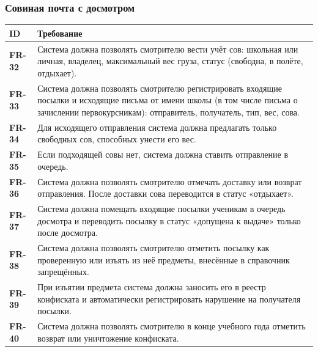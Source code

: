 \documentclass[a4paper,12pt]{article}
\newcommand{\req}[2]{\textbf{#1} & #2 \\ \hline}
\newenvironment{reqtable}{%
  \begin{longtable}{|>{\raggedright\arraybackslash}p{19mm}|>{\raggedright\arraybackslash}p{137mm}|}
  \hline
  \rowcolor{black!8}\textbf{ID} & \textbf{Требование} \\ \hline
  \endhead}{\end{longtable}}
\begin{document}
\subsubsection{Совиная почта с досмотром}
\begin{reqtable}
\req{FR-32}{Система должна позволять смотрителю вести учёт сов: школьная или личная, владелец, максимальный вес груза, статус (свободна, в полёте, отдыхает).}
\req{FR-33}{Система должна позволять смотрителю регистрировать входящие посылки и исходящие письма от имени школы (в том числе письма о зачислении первокурсникам): отправитель, получатель, тип, вес, сова.}
\req{FR-34}{Для исходящего отправления система должна предлагать только свободных сов, способных унести его вес.}
\req{FR-35}{Если подходящей совы нет, система должна ставить отправление в очередь.}
\req{FR-36}{Система должна позволять смотрителю отмечать доставку или возврат отправления. После доставки сова переводится в статус «отдыхает».}
\req{FR-37}{Система должна помещать входящие посылки ученикам в очередь досмотра и переводить посылку в статус «допущена к выдаче» только после досмотра.}
\req{FR-38}{Система должна позволять смотрителю отметить посылку как проверенную или изъять из неё предметы, внесённые в справочник запрещённых.}
\req{FR-39}{При изъятии предмета система должна заносить его в реестр конфиската и автоматически регистрировать нарушение на получателя посылки.}
\req{FR-40}{Система должна позволять смотрителю в конце учебного года отметить возврат или уничтожение конфиската.}
\end{reqtable}
 
\end{document}
